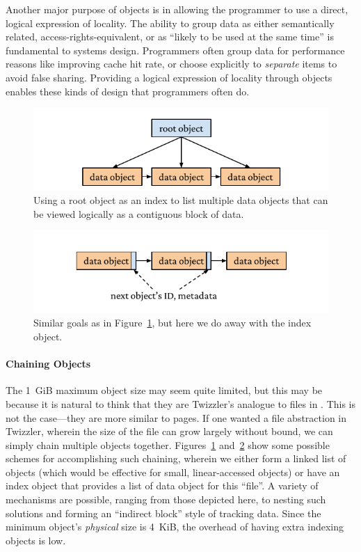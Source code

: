 Another major purpose of objects is in allowing the programmer to use a direct, logical expression of locality.
The ability to group data as either semantically related, access-rights-equivalent, or as ``likely to be used at the
same time'' is fundamental to systems design. Programmers often group data for performance reasons like improving cache
hit rate, or choose explicitly to \emph{separate} items to avoid false sharing. Providing a logical expression of
locality through objects enables these kinds of design that programmers often do.
\begin{figure}
    \centering
    \includegraphics[width=\linewidth]{fig/objectchain1.pdf}
    \caption{Using a root object as an index to list multiple data objects that can be viewed logically as a contiguous block of data.}
    \label{fig:objchain1}
\end{figure}

\begin{figure}
    \centering
    \includegraphics[width=\linewidth]{fig/objectchain2.pdf}
    \caption{Similar goals as in Figure~\ref{fig:objchain1}, but here we do away with the index object.}
    \label{fig:objchain2}
\end{figure}
\paragraph{Chaining Objects}
The 1~GiB maximum object size may seem quite limited, but this may be because it is natural to think that they are
Twizzler's analogue to files in \unix. This is not the case---they are more similar to pages. If one wanted a
file abstraction in Twizzler, wherein the size of the file can grow largely without bound, we can simply chain multiple
objects together. Figures~\ref{fig:objchain1} and~\ref{fig:objchain2} show some possible schemes for accomplishing such
chaining, wherein we either form a linked list of objects (which would be effective for small, linear-accessed objects)
or have an index object that provides a list of data object for this ``file''. A variety of mechanisms are possible,
ranging from those depicted here, to nesting such solutions and forming an ``indirect block'' style of tracking data.
Since the minimum object's \emph{physical} size is 4~KiB, the overhead of having extra indexing objects is low.



